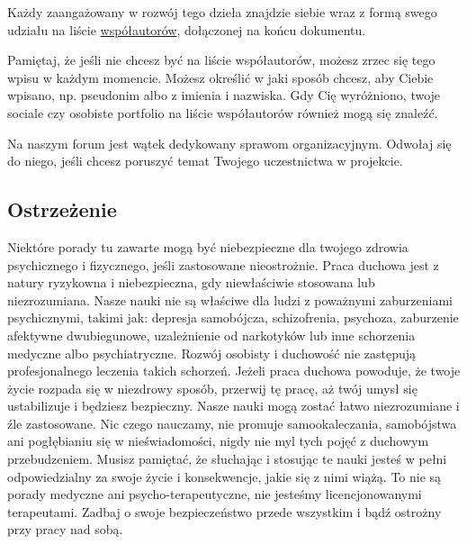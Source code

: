 \begin{multicols}{2}
    Każdy zaangażowany w rozwój tego dzieła znajdzie siebie wraz z formą swego udziału na liście \hyperref[zal:wspolautorzy]{współautorów}, dołączonej na końcu dokumentu.

    Pamiętaj, że jeśli nie chcesz być na liście współautorów, możesz zrzec się tego wpisu w każdym momencie.
    Możesz określić w jaki sposób chcesz, aby Ciebie wpisano, np. pseudonim albo z imienia i nazwiska.
    Gdy Cię wyróżniono, twoje sociale czy osobiste portfolio na liście współautorów również mogą się znaleźć.

    Na naszym forum jest wątek dedykowany sprawom organizacyjnym.
    Odwołaj się do niego, jeśli chcesz poruszyć temat Twojego uczestnictwa w projekcie.
    \vspace*{-0.8em}
\end{multicols}

\subsection*{Ostrzeżenie}
Niektóre porady tu zawarte mogą być niebezpieczne dla twojego zdrowia psychicznego i fizycznego, jeśli zastosowane nieostrożnie.
Praca duchowa jest z natury ryzykowna i niebezpieczna, gdy niewłaściwie stosowana lub niezrozumiana.
Nasze nauki nie są właściwe dla ludzi z poważnymi zaburzeniami psychicznymi, takimi jak:
depresja samobójcza, schizofrenia, psychoza, zaburzenie afektywne dwubiegunowe, uzależnienie od narkotyków lub inne schorzenia medyczne albo psychiatryczne.
Rozwój osobisty i duchowość nie zastępują profesjonalnego leczenia takich schorzeń.
Jeżeli praca duchowa powoduje, że twoje życie rozpada się w niezdrowy sposób, przerwij tę pracę, aż twój umysł się ustabilizuje i będziesz bezpieczny.
Nasze nauki mogą zostać łatwo niezrozumiane i źle zastosowane.
Nic czego nauczamy, nie promuje samookaleczania, samobójstwa ani pogłębianiu się w nieświadomości, nigdy nie myl tych pojęć z duchowym przebudzeniem.
Musisz pamiętać, że słuchając i stosując te nauki jesteś w pełni odpowiedzialny za swoje życie i konsekwencje, jakie się z nimi wiążą.
To nie są porady medyczne ani psycho-terapeutyczne, nie jesteśmy licencjonowanymi terapeutami.
Zadbaj o swoje bezpieczeństwo przede wszystkim i bądź ostrożny przy pracy nad sobą.

